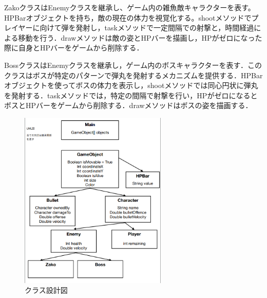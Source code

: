 \documentclass[dvipdfmx]{jlreq}
\begin{document}
ZakoクラスはEnemyクラスを継承し、ゲーム内の雑魚敵キャラクターを表す。HPBarオブジェクトを持ち，敵の現在の体力を視覚化する。shootメソッドでプレイヤーに向けて弾を発射し，taskメソッドで一定間隔での射撃と，時間経過による移動を行う．drawメソッドは敵の姿とHPバーを描画し，HPがゼロになった際に自身とHPバーをゲームから削除する．

BossクラスはEnemyクラスを継承し，ゲーム内のボスキャラクターを表す．このクラスはボスが特定のパターンで弾丸を発射するメカニズムを提供する．HPBarオブジェクトを使ってボスの体力を表示し，shootメソッドでは同心円状に弾丸を発射する．taskメソッドでは，特定の間隔で射撃を行い，HPがゼロになるとボスとHPバーをゲームから削除する．drawメソッドはボスの姿を描画する．

\begin{figure}
  \centering
  \includegraphics[width=70mm]{figures/class.png}
  \caption{クラス設計図}
  \label{fig:model}
\end{figure}
\end{document}
